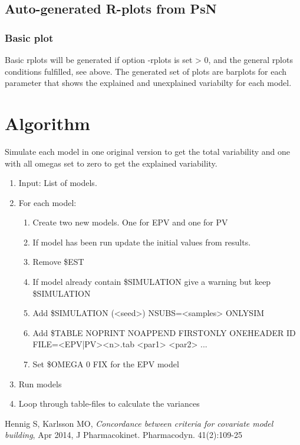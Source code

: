 \subsection{Auto-generated R-plots from PsN}
\newcommand{\rplotsconditions}{The default pvar template 
requires no extra R libraries.}


\subsubsection*{Basic plot}
Basic rplots will be generated if option -rplots is set > 0,
and the general rplots conditions fulfilled, see above.
The generated set of plots are barplots for each parameter
that shows the explained and unexplained variabilty for each
model.


\section{Algorithm}

Simulate each model in one original version to get the total variability and one with all omegas set to zero to get the explained variability.

\begin{enumerate}
	\item Input: List of models.
	\item For each model:
	\begin{enumerate}
		\item Create two new models. One for EPV and one for PV
		\item If model has been run update the initial values from results.
		\item Remove \$EST
		\item If model already contain \$SIMULATION give a warning but keep \$SIMULATION
		\item Add \$SIMULATION (<seed>) NSUBS=<samples> ONLYSIM
		\item Add \$TABLE NOPRINT NOAPPEND FIRSTONLY ONEHEADER ID FILE=<EPV|PV><n>.tab <par1> <par2> ...
		\item Set \$OMEGA 0 FIX for the EPV model
	\end{enumerate}
	\item Run models
	\item Loop through table-files to calculate the variances
\end{enumerate}

\begin{thebibliography}{99}
	 Hennig S, Karlsson MO, {\em Concordance between criteria for covariate model building}, Apr 2014, J Pharmacokinet. Pharmacodyn. 41(2):109-25
\end{thebibliography}


